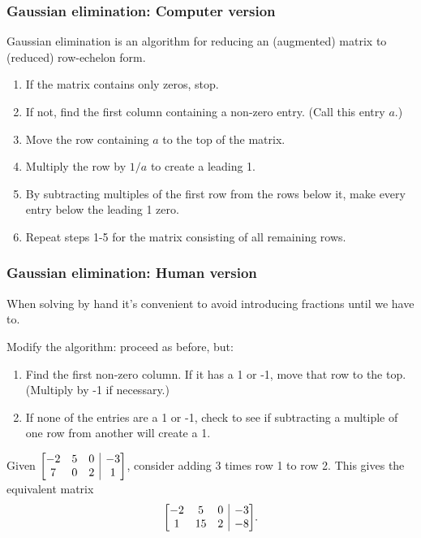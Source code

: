 \documentclass[12pt,t]{beamer}
\makeatletter
\newenvironment{amatrix}[1]{%
  \left[\begin{array}{@{}*{#1}{c}|c@{}}
}{%
  \end{array}\right]
}
\makeatother
\begin{document}
\begin{frame}\frametitle{Gaussian elimination: Computer version}
 Gaussian elimination is an algorithm for reducing an (augmented) matrix to (reduced) row-echelon form.
\begin{enumerate}
 \item If the matrix contains only zeros, stop.
 \item If not, find the first column containing a non-zero entry. (Call this entry $a$.)
 \item Move the row containing $a$ to the top of the matrix.
 \item Multiply the row by $1/a$ to create a leading 1.
 \item By subtracting multiples of the first row from the rows below it, make every entry below the leading 1 zero.
 \item Repeat steps 1-5 for the matrix consisting of all remaining rows.
\end{enumerate}
\end{frame}
\begin{frame}\frametitle{Gaussian elimination: Human version}
 When solving by hand it's convenient to avoid introducing fractions until we have to.

\alert{Modify the algorithm:} proceed as before, but:
\begin{enumerate}
 \item Find the first non-zero column. If it has a 1 or -1, move that row to the top. (Multiply by -1 if necessary.)
 \item If none of the entries are a 1 or -1, check to see if subtracting a multiple of one row from another will create a 1.
\end{enumerate}
\begin{example}
 Given $\displaystyle \begin{amatrix}{3}-2 & 5 & 0 & -3\\7 & 0 & 2 & 1\end{amatrix}$, consider adding 3 times row 1 to row 2. This gives the equivalent matrix
\[
 \begin{amatrix}{3}
  -2 & 5 & 0 & -3\\1 & 15 & 2 & -8
 \end{amatrix}.
\]
\end{example}
\end{frame}
\end{document}
